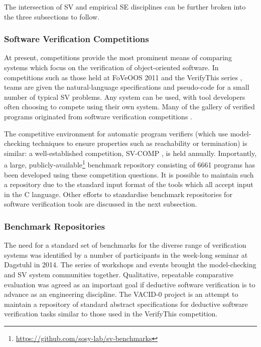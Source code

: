 The intersection of SV and empirical SE disciplines can be further broken into the three subsections to follow.      

\subsubsection{Software Verification Competitions}
\label{sub:lrsvmmbench}

At present, competitions provide the most prominent means of comparing systems which focus on the verification of object-oriented software. In competitions such as those held at FoVeOOS 2011 \cite{bormer:hal-00789525} and the VerifyThis series \cite{Huisman2015}, teams are given the natural-language specifications and pseudo-code for a small number of typical SV problems. Any system can be used, with tool developers often choosing to compete using their own system. Many of the \why gallery of verified programs originated from software verification competitions \cite{verifythis, tafat:inria-00636083} . 

The competitive environment for automatic program verifiers (which use model-checking techniques to ensure properties such as reachability or termination) is similar: a well-established competition, SV-COMP \cite{Beyer2016, SVCOMP}, is held annually. Importantly, a large, publicly-available\footnote{\url{https://github.com/sosy-lab/sv-benchmarks}} benchmark repository consisting of 6661 programs  has been developed using these competition questions. It is possible to maintain such a repository due to the standard input format of the tools which all accept input in the C language. Other efforts to standardise benchmark repositories for software verification tools are discussed in the next subsection.  

\subsubsection{Benchmark Repositories}

The need for a standard set of benchmarks for the diverse range of verification systems was identified by a number of participants in the week-long seminar at Dagstuhl \cite{Dagstuhl} in 2014. The series of workshops and events brought the model-checking and SV system communities together. Qualitative, repeatable comparative evaluation was agreed as an important goal if deductive software verification is to advance as an engineering discipline. The VACID-0 \cite{Leino10vacid-0:verification} project is an attempt to maintain a repository of standard abstract specifications for deductive software verification tasks similar to those used in the VerifyThis competition.  

